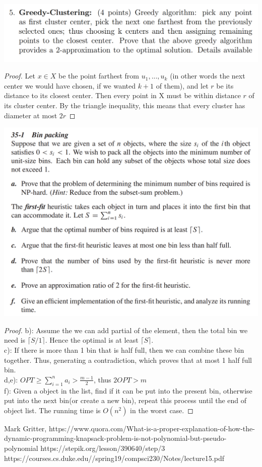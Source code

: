 \documentclass[12pt]{article}
\begin{document}
\includegraphics[scale=0.25]{5.png}
\begin{proof}
	Let $x \in X$ be the point farthest from $u_1, . . . , u_k$ (in other words the
	next center we would have chosen, if we wanted $k + 1$ of them), and let $r$ be its distance to its closest center. Then every point in X must be within distance $r$ of its cluster center. By the triangle inequality, this means that every cluster has diameter at most $2r$
\end{proof}
\includegraphics[scale=0.25]{6.png}
\begin{proof}
	b): Assume the we can add partial of the element, then the total bin we need is $\lceil S/1\rceil$. Hence the optimal is at least $\lceil S\rceil$.\\
	c): If there is more than 1 bin that is half full, then we can combine these bin together. Thus, generating a contradiction, which proves that at most 1 half full bin.\\
	d,e): $OPT \ge \sum_{i=1}^{n}a_i > \frac{m-1}{2}$, thus $2OPT >m$\\
	f): Given a object in the list, find if it can be put into the present bin, otherwise put into the next bin(or create a new bin), repeat this process until the end of object list. The running time is $O(n^2)$ in the worst case.
\end{proof}
\begin{thebibliography}{mark}
	 Mark Gritter, https://www.quora.com/What-is-a-proper-explanation-of-how-the-dynamic-programming-knapsack-problem-is-not-polynomial-but-pseudo-polynomial
	 https://stepik.org/lesson/390640/step/3
	 https://courses.cs.duke.edu//spring19/compsci230/Notes/lecture15.pdf
\end{thebibliography}
\end{document}
